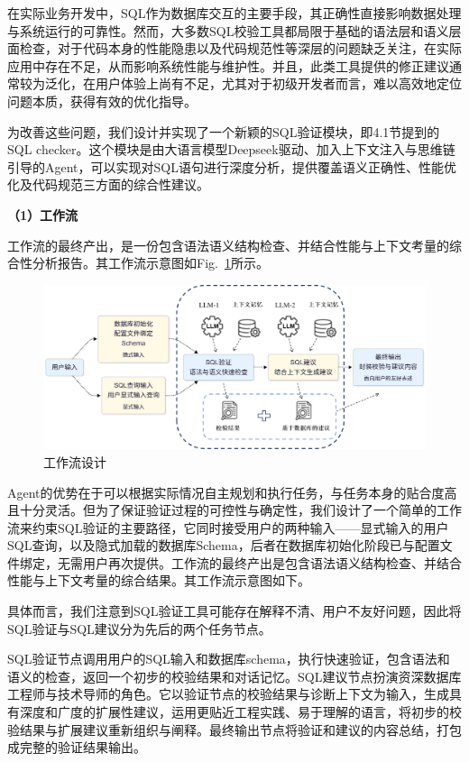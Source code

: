 \begin{CJK*}{UTF8}{song}

在实际业务开发中，SQL作为数据库交互的主要手段，其正确性直接影响数据处理与系统运行的可靠性。然而，大多数SQL校验工具都局限于基础的语法层和语义层面检查，对于代码本身的性能隐患以及代码规范性等深层的问题缺乏关注，在实际应用中存在不足，从而影响系统性能与维护性。并且，此类工具提供的修正建议通常较为泛化，在用户体验上尚有不足，尤其对于初级开发者而言，难以高效地定位问题本质，获得有效的优化指导。

为改善这些问题，我们设计并实现了一个新颖的SQL验证模块，即4.1节提到的SQL checker。这个模块是由大语言模型Deepseek驱动、加入上下文注入与思维链引导的Agent，可以实现对SQL语句进行深度分析，提供覆盖语义正确性、性能优化及代码规范三方面的综合性建议。

\textbf{（1）工作流}

工作流的最终产出，是一份包含语法语义结构检查、并结合性能与上下文考量的综合性分析报告。其工作流示意图如Fig.~\ref{fig:agent}所示。


\begin{figure}
  \includegraphics[width=\textwidth]{article/design/figures/workflow}
  \caption{工作流设计}
  \label{fig:agent}

\end{figure}

Agent的优势在于可以根据实际情况自主规划和执行任务，与任务本身的贴合度高且十分灵活。但为了保证验证过程的可控性与确定性，我们设计了一个简单的工作流来约束SQL验证的主要路径，它同时接受用户的两种输入——显式输入的用户SQL查询，以及隐式加载的数据库Schema，后者在数据库初始化阶段已与配置文件绑定，无需用户再次提供。工作流的最终产出是包含语法语义结构检查、并结合性能与上下文考量的综合结果。其工作流示意图如下。

具体而言，我们注意到SQL验证工具可能存在解释不清、用户不友好问题，因此将SQL验证与SQL建议分为先后的两个任务节点。

SQL验证节点调用用户的SQL输入和数据库schema，执行快速验证，包含语法和语义的检查，返回一个初步的校验结果和对话记忆。SQL建议节点扮演资深数据库工程师与技术导师的角色。它以验证节点的校验结果与诊断上下文为输入，生成具有深度和广度的扩展性建议，运用更贴近工程实践、易于理解的语言，将初步的校验结果与扩展建议重新组织与阐释。最终输出节点将验证和建议的内容总结，打包成完整的验证结果输出。


\end{CJK*}
